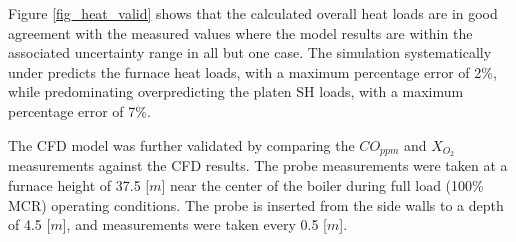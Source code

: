 \documentclass[twocolumn,10pt]{asme2ej}
\begin{document}
Figure \ref{fig_heat_valid} shows that the calculated overall heat loads are in good agreement with the measured values where the model results are within the associated uncertainty range in all but one case. The simulation systematically under predicts the furnace heat loads, with a maximum percentage error of 2\%, while predominating overpredicting the platen SH loads, with a maximum percentage error of 7\%.

The CFD model was further validated by comparing the $CO_{ppm}$ and $X_{O_{2}}$ measurements against the CFD results. The probe measurements were taken at a furnace height of 37.5 [$m$] near the center of the boiler during full load (100\% MCR) operating conditions. The probe is inserted from the side walls to a depth of 4.5 [$m$], and measurements were taken every 0.5 [$m$].
\end{document}
